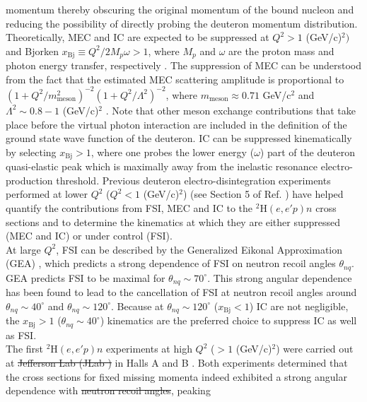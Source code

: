 \documentclass[aps,prl,twocolumn,showpacs,superscriptaddress,groupedaddress]{revtex4-2}  %
\providecommand{\DIFaddtex}[1]{{\protect\color{blue}\uwave{#1}}} %
\providecommand{\DIFdeltex}[1]{{\protect\color{red}\sout{#1}}}                      %
\providecommand{\DIFaddbegin}{} %
\providecommand{\DIFaddend}{} %
\providecommand{\DIFdelbegin}{} %
\providecommand{\DIFdelend}{} %
\providecommand{\DIFadd}[1]{\texorpdfstring{\DIFaddtex{#1}}{#1}} %
\providecommand{\DIFdel}[1]{\texorpdfstring{\DIFdeltex{#1}}{}} %
\newcommand{\DIFscaledelfig}{0.5}
\newlength{\DIFdelgraphicswidth} %
\newlength{\DIFdelgraphicsheight} %
\newcommand{\DIFaddincludegraphics}[2][]{{\color{blue}\fbox{\DIFOincludegraphics[#1]{#2}}}} %
\newcommand{\DIFdelincludegraphics}[2][]{%
\sbox{\DIFdelgraphicsbox}{\DIFOincludegraphics[#1]{#2}}%
\settoboxwidth{\DIFdelgraphicswidth}{\DIFdelgraphicsbox} %
\settoboxtotalheight{\DIFdelgraphicsheight}{\DIFdelgraphicsbox} %
\scalebox{\DIFscaledelfig}{%
\parbox[b]{\DIFdelgraphicswidth}{\usebox{\DIFdelgraphicsbox}\\[-\baselineskip] \rule{\DIFdelgraphicswidth}{0em}}\llap{\resizebox{\DIFdelgraphicswidth}{\DIFdelgraphicsheight}{%
\setlength{\unitlength}{\DIFdelgraphicswidth}%
\begin{picture}(1,1)%
\thicklines\linethickness{2pt} %
{\color[rgb]{1,0,0}\put(0,0){\framebox(1,1){}}}%
{\color[rgb]{1,0,0}\put(0,0){\line( 1,1){1}}}%
{\color[rgb]{1,0,0}\put(0,1){\line(1,-1){1}}}%
\end{picture}%
}\hspace*{3pt}}} %
} %
\DeclareRobustCommand{\DIFaddbegin}{\DIFOaddbegin \let\includegraphics\DIFaddincludegraphics} %
\DeclareRobustCommand{\DIFaddend}{\DIFOaddend \let\includegraphics\DIFOincludegraphics} %
\DeclareRobustCommand{\DIFdelbegin}{\DIFOdelbegin \let\includegraphics\DIFdelincludegraphics} %
\DeclareRobustCommand{\DIFdelend}{\DIFOaddend \let\includegraphics\DIFOincludegraphics} %
\begin{document}
momentum thereby obscuring the original momentum of the bound nucleon and reducing the possibility of directly probing the deuteron momentum distribution. \\
\indent Theoretically, MEC and IC are expected to be suppressed at $Q^{2}>1$ (GeV/c)$^{2})$ and Bjorken $x_{\mathrm{Bj}}\equiv Q^{2}/2M_{p}\omega>1$, where $M_{p}$ and $\omega$ are the proton mass and photon energy transfer, respectively \cite{sargsian_2015}.
The suppression of MEC can be understood from the fact that the estimated MEC scattering amplitude is proportional to  $(1 + Q^{2}/m^{2}_{\mathrm{meson}})^{-2}(1+Q^{2}/\Lambda^{2})^{-2}$, where $m_{\mathrm{meson}}\approx0.71$ GeV/c$^{2}$ and
$\Lambda^{2}\sim 0.8-1 $ (GeV/c)$^{2}$ \cite{Sargsian_2001}. Note that other meson exchange contributions that take place before the virtual photon interaction are included in the definition of the ground state wave function of the deuteron. IC can be suppressed kinematically by selecting $x_{\mathrm{Bj}}>1$, where one probes the lower energy ($\omega$) part of the deuteron quasi-elastic peak which is maximally away from the inelastic resonance
electro-production threshold. Previous deuteron electro-disintegration experiments performed at lower $Q^{2}$ ($Q^{2}<1$ (GeV/c)$^{2}$) (see Section 5 of Ref. \cite{sargsian_2015}) have helped quantify the contributions
from FSI, MEC and IC to the $^{2}\mathrm{H}(e,e'p)n$ cross sections and to determine the kinematics at which they are either suppressed (MEC and IC) or under control (FSI).  \\
\indent At large $Q^{2}$, FSI can be described by the Generalized Eikonal Approximation (GEA) \cite{Sargsian_2001,PhysRevC.56.1124,sargsian_2015}, which predicts a strong dependence of FSI on neutron recoil angles $\theta_{nq}$.
GEA predicts FSI to be maximal for $\theta_{nq}\sim70^{\circ}$. This strong angular dependence has been found to lead to the cancellation of FSI at neutron recoil angles around $\theta_{nq}\sim40^{\circ}$ and $\theta_{nq}\sim120^{\circ}$. Because at
$\theta_{nq}\sim120^{\circ}$ ($x_{\mathrm{Bj}}<1$) IC are not negligible, the $x_{\mathrm{Bj}}>1$ ($\theta_{nq}\sim40^{\circ}$) kinematics are the preferred choice to suppress IC as well as FSI. \\
\indent The first $^{2}\mathrm{H}(e,e'p)n$ experiments at high $Q^{2}$ ($>1$ (GeV/c)$^{2}$) were carried out at \DIFdelbegin \DIFdel{Jefferson Lab (JLab ) }\DIFdelend \DIFaddbegin \DIFadd{JLab }\DIFaddend in Halls A \cite{PhysRevLett.107.262501} and B \cite{PhysRevLett.98.262502}. Both
experiments determined that the cross sections for fixed missing momenta indeed exhibited a strong angular dependence with \DIFdelbegin \DIFdel{neutron recoil angles}\DIFdelend \DIFaddbegin \DIFadd{$\theta_{nq}$}\DIFaddend , peaking
\end{document}

